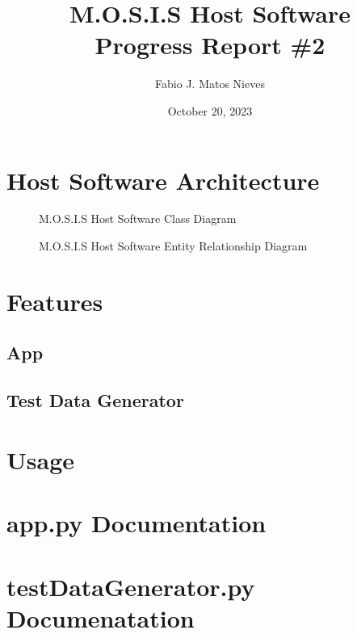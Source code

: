 \documentclass[12pt]{article}
\author{Fabio J. Matos Nieves}
\date{October 20, 2023}
\title{M.O.S.I.S Host Software\\Progress Report \#2}
\begin{document}

\tableofcontents
\newpage
\section{Host Software Architecture}
\begin{figure}[H]
  \caption{M.O.S.I.S Host Software Class Diagram}
\end{figure}
\begin{figure}[H]
  \caption{M.O.S.I.S Host Software Entity Relationship Diagram}
\end{figure}
\section{Features}
\subsection{App}
\subsection{Test Data Generator}
\section{Usage}
\appendix
\section{app.py Documentation}

\section{testDataGenerator.py Documenatation}

\end{document}
